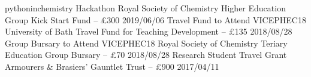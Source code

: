 \begin{cvpubs}
  \cvpub
    {pythoninchemistry Hackathon}
    {Royal Society of Chemistry Higher Education Group Kick Start Fund -- £300}
    {2019/06/06}
  \cvpub
    {Travel Fund to Attend VICEPHEC18}
    {University of Bath Travel Fund for Teaching Development -- £135}
    {2018/08/28}
  \cvpub
    {Group Bursary to Attend VICEPHEC18}
    {Royal Society of Chemistry Teriary Education Group Bursary -- £70}
    {2018/08/28}
  \cvpub
  	{Research Student Travel Grant}
    {Armourers \& Brasiers' Gauntlet Trust -- £900}
    {2017/04/11}
\end{cvpubs}
